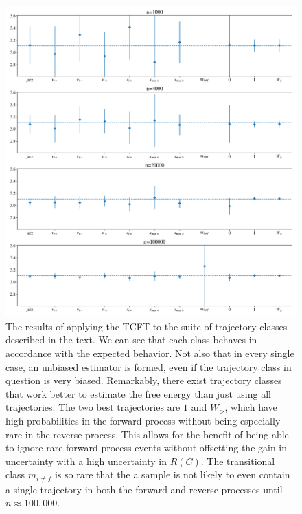 \documentclass[paper=a4, fontsize=10pt]{article} %
\numberwithin{equation}{section} %
\numberwithin{figure}{section} %
\numberwithin{table}{section} %
\begin{document}
\begin{figure}
\includegraphics[width=\columnwidth, trim=0 0 0 0, clip]{Variance_Scaling.pdf}
\caption{The results of applying the TCFT to the suite of trajectory classes described in the text. We can see that each class behaves in accordance with the expected behavior. Not also that in every single case, an unbiased estimator is formed, even if the trajectory class in question is very biased. Remarkably, there exist trajectory classes that work better to estimate the free energy than just using all trajectories. The two best trajectories are $1$ and $W_>$, which have high probabilities in the forward process without being especially rare in the reverse process. This allows for the benefit of being able to ignore rare forward process events without offsetting the gain in uncertainty with a high uncertainty in $R(C)$. The transitional class $m_{i\neq f}$ is so rare that the a sample is not likely to even contain a single trajectory in both the forward and reverse processes until $n\approx 100,000$.}
\label{fig:VarScaling}
\end{figure}
\end{document}
